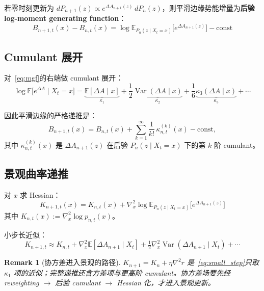 \documentclass[11pt,a4paper]{article}
\newtheorem{remark}[theorem]{Remark}
\DeclareMathOperator{\Var}{Var}
\newcommand{\E}{\mathbb{E}}
\begin{document}
若零时刻更新为 $dP_{n+1}(z) \propto e^{\Delta A_{n+1}(z)}\,dP_n(z)$，则平滑边缘势能增量为\textbf{后验 log-moment generating function}：
\begin{equation}\label{eq:mgf}
\boxed{
B_{n+1,t}(x) - B_{n,t}(x) = \log\E_{P_n(z\mid X_t=x)}\!\bigl[e^{\Delta A_{n+1}(z)}\bigr] - \text{const}
}
\end{equation}

\subsection{Cumulant 展开}

对~\eqref{eq:mgf}的右端做 cumulant 展开：
\begin{equation}\label{eq:cumulant_expansion}
\log\E\!\bigl[e^{\Delta A}\mid X_t{=}x\bigr] = \underbrace{\E[\Delta A\mid x]}_{\kappa_1} + \frac{1}{2}\underbrace{\Var(\Delta A\mid x)}_{\kappa_2} + \frac{1}{6}\underbrace{\kappa_3(\Delta A\mid x)}_{\kappa_3} + \cdots
\end{equation}

因此平滑边缘的严格递推是：
\begin{equation}\label{eq:landscape_recursion}
B_{n+1,t}(x) = B_{n,t}(x) + \sum_{k=1}^{\infty} \frac{1}{k!}\,\kappa_{n,t}^{(k)}(x) - \text{const},
\end{equation}
其中 $\kappa_{n,t}^{(k)}(x)$ 是 $\Delta A_{n+1}(z)$ 在后验 $P_n(z\mid X_t{=}x)$ 下的第 $k$ 阶 cumulant。

\subsection{景观曲率递推}

对 $x$ 求 Hessian：
\begin{equation}\label{eq:curvature_recursion}
\boxed{
K_{n+1,t}(x) = K_{n,t}(x) + \nabla_x^2 \log\E_{P_n(z\mid X_t=x)}\!\bigl[e^{\Delta A_{n+1}(z)}\bigr]
}
\end{equation}
其中 $K_{n,t}(x) := \nabla_x^2 \log p_{n,t}(x)$。

小步长近似：
\begin{equation}\label{eq:small_step}
K_{n+1,t} \approx K_{n,t} + \nabla_x^2 \E[\Delta A_{n+1}\mid X_t] + \tfrac{1}{2}\nabla_x^2 \Var(\Delta A_{n+1}\mid X_t) + \cdots
\end{equation}

\begin{remark}[协方差进入景观的路径]
$K_{n+1} = K_n + \eta\nabla^2 r$ 是~\eqref{eq:small_step}只取 $\kappa_1$ 项的近似；完整递推还含方差项与更高阶 cumulant。协方差场要先经 reweighting $\to$ 后验 cumulant $\to$ Hessian 化，才进入景观更新。
\end{remark}
\end{document}
